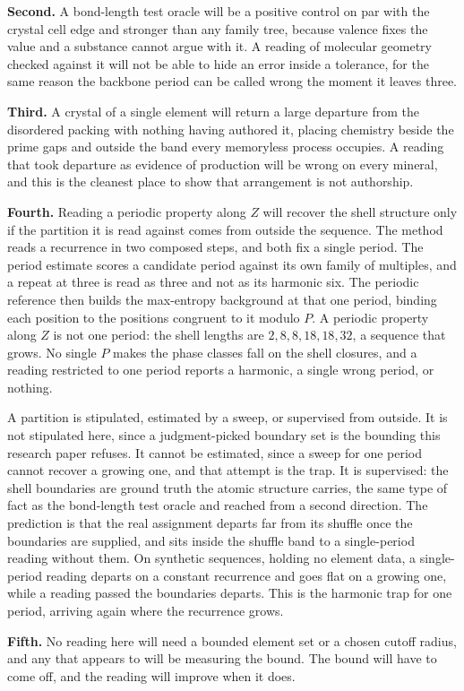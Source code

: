 \textbf{Second.} A bond-length test oracle will be a positive control on par with the crystal cell
edge and stronger than any family tree, because valence fixes the value and a substance cannot argue
with it. A reading of molecular geometry checked against it will not be able to hide an error inside
a tolerance, for the same reason the backbone period can be called wrong the moment it leaves three.

\textbf{Third.} A crystal of a single element will return a large departure from the disordered
packing with nothing having authored it, placing chemistry beside the prime gaps and outside the band
every memoryless process occupies. A reading that took departure as evidence of production will be
wrong on every mineral, and this is the cleanest place to show that arrangement is not authorship.

\textbf{Fourth.} Reading a periodic property along \(Z\) will recover the shell structure only if the
partition it is read against comes from outside the sequence. The method reads a recurrence in two
composed steps, and both fix a single period. The period estimate scores a candidate period against
its own family of multiples, and a repeat at three is read as three and not as its harmonic six. The
periodic reference then builds the max-entropy background at that one period, binding each
position to the positions congruent to it modulo \(P\). A periodic property along \(Z\) is not one
period: the shell lengths are \(2, 8, 8, 18, 18, 32\), a sequence that grows. No single \(P\) makes the
phase classes fall on the shell closures, and a reading restricted to one period reports a harmonic,
a single wrong period, or nothing.

A partition is stipulated, estimated by a sweep, or supervised from outside. It is not stipulated
here, since a judgment-picked boundary set is the bounding this research paper refuses. It cannot be
estimated, since a sweep for one period cannot recover a growing one, and that attempt is the trap.
It is supervised: the shell boundaries are ground truth the atomic structure carries, the same type
of fact as the bond-length test oracle and reached from a second direction. The prediction is that
the real assignment departs far from its shuffle once the boundaries are supplied, and sits inside
the shuffle band to a single-period reading without them. On synthetic sequences, holding no element
data, a single-period reading departs on a constant recurrence and goes flat on a growing one, while
a reading passed the boundaries departs. This is the harmonic trap for one period, arriving again
where the recurrence grows.

\textbf{Fifth.} No reading here will need a bounded element set or a chosen cutoff radius, and any
that appears to will be measuring the bound. The bound will have to come off, and the reading will
improve when it does.
